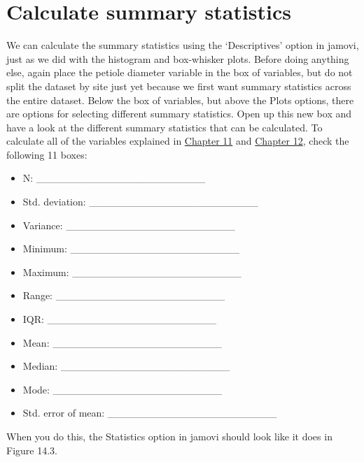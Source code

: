 \documentclass[
  openany]{scrbook}
\providecommand{\tightlist}{%
  \setlength{\itemsep}{0pt}\setlength{\parskip}{0pt}}
\begin{document}
\hypertarget{calculate-summary-statistics}{%
\section{Calculate summary statistics}\label{calculate-summary-statistics}}

We can calculate the summary statistics using the `Descriptives' option in jamovi, just as we did with the histogram and box-whisker plots.
Before doing anything else, again place the petiole diameter variable in the box of variables, but do not split the dataset by site just yet because we first want summary statistics across the entire dataset.
Below the box of variables, but above the Plots options, there are options for selecting different summary statistics.
Open up this new box and have a look at the different summary statistics that can be calculated.
To calculate all of the variables explained in \protect\hyperlink{Chapter_11}{Chapter 11} and \protect\hyperlink{Chapter_12}{Chapter 12}, check the following 11 boxes:

\begin{itemize}
\tightlist
\item
  N: \_\_\_\_\_\_\_\_\_\_\_\_\_\_\_\_\_\_\_\_\_\_\_
\item
  Std. deviation: \_\_\_\_\_\_\_\_\_\_\_\_\_\_\_\_\_\_\_\_\_\_\_
\item
  Variance: \_\_\_\_\_\_\_\_\_\_\_\_\_\_\_\_\_\_\_\_\_\_\_
\item
  Minimum: \_\_\_\_\_\_\_\_\_\_\_\_\_\_\_\_\_\_\_\_\_\_\_
\item
  Maximum: \_\_\_\_\_\_\_\_\_\_\_\_\_\_\_\_\_\_\_\_\_\_\_
\item
  Range: \_\_\_\_\_\_\_\_\_\_\_\_\_\_\_\_\_\_\_\_\_\_\_
\item
  IQR: \_\_\_\_\_\_\_\_\_\_\_\_\_\_\_\_\_\_\_\_\_\_\_
\item
  Mean: \_\_\_\_\_\_\_\_\_\_\_\_\_\_\_\_\_\_\_\_\_\_\_
\item
  Median: \_\_\_\_\_\_\_\_\_\_\_\_\_\_\_\_\_\_\_\_\_\_\_
\item
  Mode: \_\_\_\_\_\_\_\_\_\_\_\_\_\_\_\_\_\_\_\_\_\_\_
\item
  Std. error of mean: \_\_\_\_\_\_\_\_\_\_\_\_\_\_\_\_\_\_\_\_\_\_\_
\end{itemize}

When you do this, the Statistics option in jamovi should look like it does in Figure 14.3.
\end{document}
